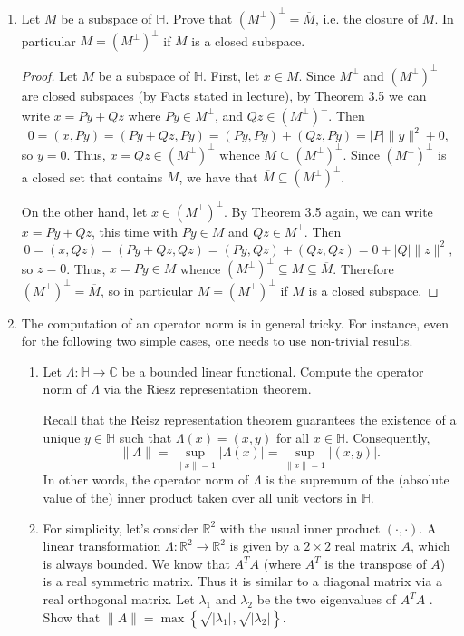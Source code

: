 \documentclass[11pt,oneside,english]{amsart}
\theoremstyle{definition}
\newcommand{\MB}[1]{\mathbb{#1}}
\begin{document}
\begin{enumerate}
\pagebreak

\item Let $M$ be a subspace of $\MB{H}$. Prove that $\left(M^\perp\right)^\perp=\overline{M}$, i.e. the closure of $M$. In particular $M=\left(M^\perp\right)^\perp$ if $M$ is a closed subspace.

\begin{proof}
Let $M$ be a subspace of $\MB{H}$. First, let $x\in M$. Since $M^\perp$ and $\left(M^\perp\right)^\perp$ are closed subspaces (by Facts stated in lecture), by Theorem 3.5 we can write $x=Py+Qz$ where $Py\in M^\perp$, and $Qz\in \left(M^\perp\right)^\perp$. Then 
\[
0=(x,Py)=(Py+Qz,Py)=(Py,Py)+(Qz,Py)=|P|\|y\|^2+0,
\]
so $y=0$. Thus, $x=Qz\in\left(M^\perp\right)^\perp$ whence $M\subseteq \left(M^\perp\right)^\perp$. Since $\left(M^\perp\right)^\perp$ is a closed set that contains $M$, we have that $\overline{M}\subseteq\left(M^\perp\right)^\perp$.


On the other hand, let $x\in \left(M^\perp\right)^\perp$. By Theorem 3.5 again, we can write $x=Py+Qz$, this time with $Py\in M$ and $Qz\in M^\perp$. Then
\[
0=(x,Qz)=(Py+Qz,Qz)=(Py,Qz)+(Qz,Qz)=0+|Q|\|z\|^2,
\]
so $z=0$. Thus, $x=Py\in M$ whence $\left(M^\perp\right)^\perp\subseteq M\subseteq \overline{M}$. Therefore $\left(M^\perp\right)^\perp=\overline{M}$, so in particular $M=\left(M^\perp\right)^\perp$ if $M$ is a closed subspace.
\end{proof}

\item The computation of an operator norm is in general tricky. For instance, even for the following two simple cases, one needs to use non-trivial results.

\begin{enumerate}
\itemsep5mm
\item Let $\Lambda:\MB{H}\to\MB{C}$ be a bounded linear functional. Compute the operator norm of $\Lambda$ via the Riesz representation theorem.

Recall that the Reisz representation theorem guarantees the existence of a unique $y\in \MB{H}$ such that $\Lambda(x)=(x,y)$ for all $x\in \MB{H}$. Consequently,
\[
\|\Lambda\|=\sup_{\|x\|=1}|\Lambda(x)|=\sup_{\|x\|=1}|(x,y)|.
\]
In other words, the operator norm of $\Lambda$ is the supremum of the (absolute value of the) inner product taken over all unit vectors in $\MB{H}$.

\item For simplicity, let's consider $\MB{R}^2$ with the usual inner product $(\cdot,\cdot)$. A linear transformation $\Lambda: \MB{R}^2\to\MB{R}^2$ is given by a $2\times 2$ real matrix $A$, which is always bounded. We know that $A^TA$ (where $A^T$ is the transpose of $A$) is a real symmetric matrix. Thus it is similar to a diagonal matrix via a real orthogonal matrix. Let $\lambda_1$ and $\lambda_2$ be the two eigenvalues of $A^TA$ . Show that $\|A\|=\max\left\{\sqrt{|\lambda_1|},\sqrt{|\lambda_2|}\right\}$.
\end{enumerate}


\end{enumerate}
\end{document}
